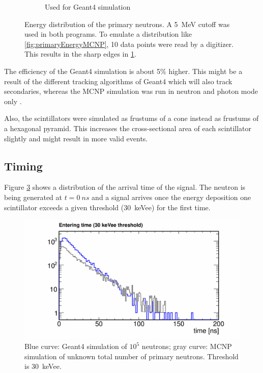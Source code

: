 \documentclass[12pt]{article}
\begin{document}
\begin{figure}[htbp]
\begin{subfigure}[t]{0.55\textwidth}
  		\caption{Used for Geant4 simulation}
  		\label{fig:primaryEnergyGeant4}
  	\end{subfigure}
  	\caption{Energy distribution of the primary neutrons. A \SI{5}{MeV} cutoff was used in both programs. To emulate a distribution like  \ref{fig:primaryEnergyMCNP}, 10 data points were read by a digitizer. This results in the sharp edges in \ref{fig:primaryEnergyGeant4}.}
  	\label{fig_primaryEnergies}
  \end{figure}
  
 The efficiency of the Geant4 simulation is about 5\% higher. This might be a result of the different tracking algorithms of Geant4 which will also track secondaries, whereas the MCNP simulation was run in neutron and photon mode only \cite[p.2]{MCNP}. 
 
 Also, the scintillators were simulated as frustums of a cone instead as frustums of a hexagonal pyramid. This increases the cross-sectional area of each scintillator slightly and might result in more valid events.   
 
\subsection{Timing}

Figure \ref{fig:timing30} shows a distribution of the arrival time of the signal. The neutron is being generated at $t=\SI{0}{ns}$ and a signal arrives once the energy deposition one scintillator exceeds a given threshold (\SI{30}{keVee}) for the first time.
 \begin{figure}[H]
 	     \includegraphics[trim = 0cm 0cm 0cm 1.1cm, clip, width=\textwidth]{pics/timing.pdf}
 	\caption{Blue curve: Geant4 simulation of $10^5$ neutrons; gray curve: MCNP simulation of unknown total number of primary neutrons.  Threshold is \SI{30}{keVee}.}
 	\label{fig:timing30}
 \end{figure}
\end{document}
